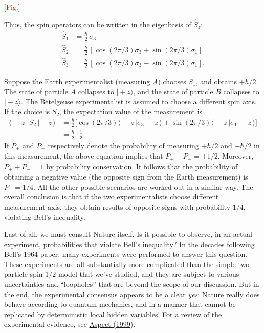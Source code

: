 \documentclass[pra,11pt]{revtex4}
\begin{document}
\textcolor{red}{[Fig.]}

Thus, the spin operators can be written in the eigenbasis of $\hat{S}_z$:
$$\begin{aligned}\hat{S}_1 &= \frac{\hbar}{2} \, \sigma_3 \\ \hat{S}_2 &= \frac{\hbar}{2} \, \left[\cos(2\pi/3) \sigma_3 + \sin(2\pi/3)\sigma_1\right]  \\   \hat{S}_3 &= \frac{\hbar}{2} \, \left[\cos(2\pi/3) \sigma_3 - \sin(2\pi/3)\sigma_1\right].\end{aligned}$$

Suppose the Earth experimentalist (measuring $A$) chooses $S_1$, and
obtains $+\hbar/2$.  The state of particle $A$ collapses to
$|\!+\!z\rangle$, and the state of particle $B$ collapses to
$|\!-\!z\rangle$.  The Betelgeuse experimentalist is assumed to
choose a different spin axis.  If the choice is $S_2$, the expectation
value of the measurement is
$$\begin{aligned}\langle\, - z \, | \, S_2 \,|-\!z\,\rangle &= \frac{\hbar}{2} \Big[\cos(2\pi/3) \langle\,- z\,|\sigma_3| - \!z\,\rangle + \sin(2\pi/3)\langle\,- z\,|\sigma_1|-\!z\,\rangle\Big]\\ &= \frac{\hbar}{2} \cdot \frac{1}{2} \end{aligned}$$
If $P_+$ and $P_-$ respectively denote the probability of measuring
$+\hbar/2$ and $-\hbar/2$ in this measurement, the above equation
implies that $P_+ - P_- = + 1/2$.  Moreover, $P_+ + P_- = 1$ by
probability conservation.  It follows that the probability of
obtaining a negative value (the opposite sign from the Earth
measurement) is $P_- = 1/4$.  All the other possible scenarios are
worked out in a similar way.  The overall conclusion is that if the
two experimentalists choose different measurement axis, they obtain
results of opposite signs with probability $1/4$, violating Bell's
inequality.

Last of all, we must consult Nature itself.  Is it possible to
observe, in an actual experiment, probabilities that violate Bell's
inequality?  In the decades following Bell's 1964 paper, many
experiments were performed to answer this question.  These experiments
are all substantially more complicated than the simple two-particle
spin-$1/2$ model that we've studied, and they are subject to various
uncertainties and ``loopholes'' that are beyond the scope of our
discussion.  But in the end, the experimental consensus appears to be
a clear \textit{yes}: Nature really does behave according to quantum
mechanics, and in a manner that cannot be replicated by deterministic
local hidden variables!  For a review of the experimental evidence,
see \hyperref[cite:aspect]{Aspect (1999)}.
\end{document}
